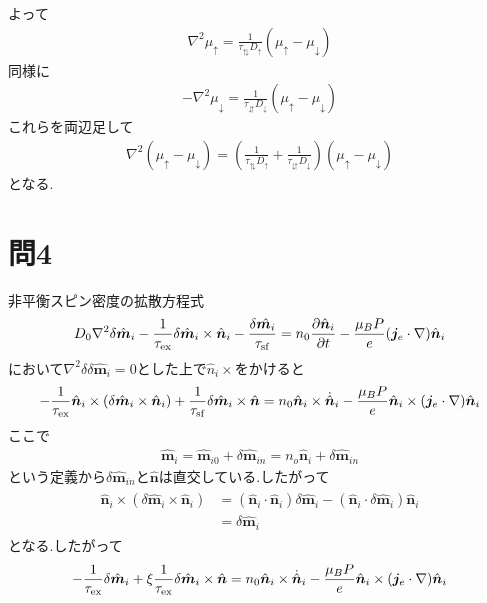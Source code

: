 \documentclass[uplatex,a4j,11pt,dvipdfmx]{jsarticle}
\begin{document}
よって
\begin{align}
  \label{equ34}
  \nabla^2\mu_\uparrow=\frac{1}{\tau_\updownarrows D_\uparrow}(\mu_\uparrow-\mu_\downarrow)
\end{align}
同様に
\begin{align}
  -\nabla^2\mu_\downarrow=\frac{1}{\tau_\downuparrows D_\downarrow}(\mu_\uparrow-\mu_\downarrow)
\end{align}
これらを両辺足して
\begin{align}
  \nabla^2(\mu_\uparrow-\mu_\downarrow)=\left(\frac{1}{\tau_\updownarrows D_\uparrow}+\frac{1}{\tau_\downuparrows D_\downarrow}\right)(\mu_\uparrow-\mu_\downarrow)
\end{align}
となる.\cite{spinOneD10:online}\cite{topo}
\clearpage
\section*{問4}
非平衡スピン密度の拡散方程式
\begin{align}
  \label{equ41}
  D_0\nabla^2\delta\hat{\bm m}_i-\frac{1}{\tau_{\rm ex}}\delta\hat{\bm m}_i\times\hat{\bm n}_i-\frac{\delta\hat{\bm m_i}}{\tau_{\rm sf}}
  =n_0\frac{\partial\hat{\bm n}_i}{\partial t}-\frac{\mu_BP}{e}({\bm j}_e\cdot\nabla)\hat{\bm n}_i
\end{align}
において$\nabla^2\delta\delta\hat{\bm m}_i=0$とした上で$\hat{n}_i\times$をかけると
\begin{align}
  -\frac{1}{\tau_{\rm ex}}\hat{\bm n}_i\times(\delta\hat{\bm m}_i\times\hat{\bm n}_i)+\frac{1}{\tau_{\rm sf}}\delta\hat{\bm m}_i\times\hat{\bm n}
  =n_0\hat{\bm n}_i\times\dot{\hat{\bm n}}_i-\frac{\mu_BP}{e}\hat{\bm n}_i\times({\bm j}_e\cdot\nabla)\hat{\bm n}_i
\end{align}
ここで
\begin{align}
  \label{equ42}
  \hat{\bm m}_i=\hat{\bm m}_{i0}+\delta\hat{\bm m}_{in}=n_o\hat{\bm n}_i+\delta\hat{\bm m}_{in}
\end{align}
という定義から$\delta\hat{\bm m}_{in}$と$\hat{\bm n}$は直交している.したがって
\begin{align}
  \begin{split}
    \hat{\bm n}_i\times(\delta\hat{\bm m}_i\times\hat{\bm n}_i)&=
    (\hat{\bm n}_i\cdot\hat{\bm n}_i)\delta\hat{\bm m}_i-(\hat{\bm n}_i\cdot\delta\hat{\bm m}_i)\hat{\bm n}_i\\
    &=\delta\hat{\bm m}_i
  \end{split}
\end{align}
となる.したがって
\begin{align}
  -\frac{1}{\tau_{\rm ex}}\delta\hat{\bm m}_i+\xi\frac{1}{\tau_{\rm ex}}\delta\hat{\bm m}_i\times\hat{\bm n}
  =n_0\hat{\bm n}_i\times\dot{\hat{\bm n}}_i-\frac{\mu_BP}{e}\hat{\bm n}_i\times({\bm j}_e\cdot\nabla)\hat{\bm n}_i
\end{align}
\end{document}
